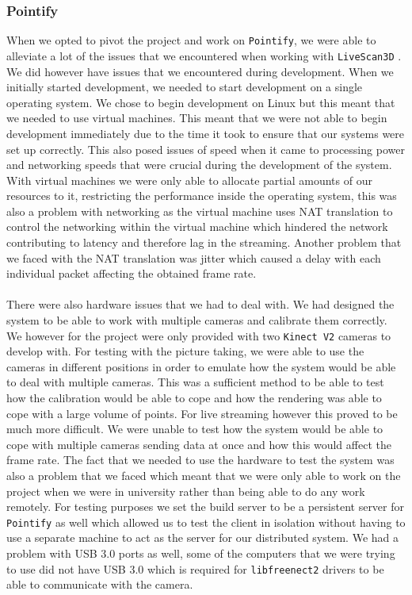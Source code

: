\documentclass{article}
\begin{document}
\subsubsection{Pointify}
When we opted to pivot the project and work on \texttt{Pointify}, we were able to alleviate a lot of the issues that we encountered when working with \texttt{LiveScan3D} \cite{livescan}. We did however have issues that we encountered during development. When we initially started development, we needed to start development on a single operating system. We chose to begin development on Linux but this meant that we needed
to use virtual machines. This meant that we were not able to begin development immediately due to the time it took to ensure that our systems were set up correctly. This also posed issues of speed when it came to processing power and networking speeds that were crucial during the development of the system. With virtual machines we were only able to allocate partial amounts of our resources to it, restricting the performance inside the operating system, this was also a problem with networking as the virtual machine uses NAT translation to control the networking within the virtual machine which hindered the network contributing to latency and therefore lag in the streaming. Another problem that we faced with the NAT translation was jitter which caused a delay with each individual packet affecting the obtained frame rate. 
\\\\
There were also hardware issues that we had to deal with. We had designed the system to be able to work with multiple cameras and calibrate them correctly. We however for the project were only provided with two \texttt{Kinect V2} cameras to develop with. For testing with the picture taking, we were able to use the cameras in different positions in order to emulate how the system would be able to deal with multiple cameras. This was a sufficient method to be able to test how the calibration would be able to cope and how the rendering was able to cope with a large volume of points. For live streaming however this proved to be much more difficult. We were unable to test how the system would be able to cope with multiple cameras sending data at once and how this would affect the frame rate. The fact that we needed to use the hardware to test the system was also a problem that we faced which meant that we were only able to work on the project when we were in university rather than being able to do any work remotely. For testing purposes we set the build server to be a persistent server for \texttt{Pointify} as well which allowed us to test the client in isolation without having to use a separate machine to act as the server for our distributed system. We had a problem with USB 3.0 ports as well, some of the computers that we were trying to use did not have USB 3.0 which is required for \texttt{libfreenect2} \cite{libfreenect} drivers to be able to communicate with the camera.
\newpage
\end{document}
